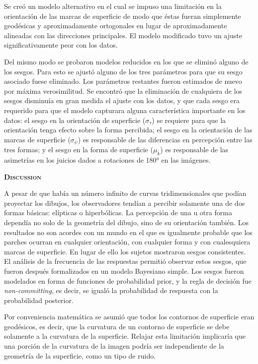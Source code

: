 \documentclass[a4paper,12pt]{article}
\begin{document}
Se creó un modelo alternativo en el cual se impuso una limitación en la orientación de las marcas de superficie de modo que éstas fueran simplemente geodésicas y aproximadamente ortogonales en lugar de aproximadamente alineadas con las direcciones principales. El modelo modificado tuvo un ajuste significativamente peor con los datos.

Del mismo modo se probaron modelos reducidos en los que se eliminó alguno de los sesgos. Para esto se ajustó alguno de los tres parámetros para que su sesgo asociado fuese eliminado. Los parámetros restantes fueron estimados de nuevo por máxima verosimilitud. Se encontró que la eliminación de cualquiera de los sesgos disminuía en gran medida el ajuste con los datos, y que cada sesgo era requerido para que el modelo capturara alguna característica importante en los datos: el sesgo en la orientación de superficie ($\sigma_{\tau}$) se requiere para que la orientación tenga efecto sobre la forma percibida; el sesgo en la orientación de las marcas de superficie ($\sigma_{\psi}$) es responsable de las diferencias en percepción entre las tres formas; y el sesgo en la forma de superficie ($\mu_{k}$) es responsable de las asimetrías en los juicios dados a rotaciones de 180° en las imágenes.

{\scshape\bfseries Discussion}

A pesar de que había un número infinito de curvas tridimensionales que podían proyectar los dibujos, los observadores tendían a percibir solamente una de dos formas básicas: elípticas o hiperbólicas. La percepción de una u otra forma dependía no solo de la geometría del dibujo, sino de su orientación también. Los resultados no son acordes con un mundo en el que es igualmente probable que los parches ocurran en cualquier orientación, con cualquier forma y con cualesquiera marcas de superficie. En lugar de ello los sujetos mostraron sesgos consistentes. El análisis de la frecuencia de las respuestas permitió observar estos sesgos, que fueron después formalizados en un modelo Bayesiano simple. Los sesgos fueron modelados en forma de funciones de probabilidad prior, y la regla de decisión fue {\itshape non-committing}, es decir, se igualó la probabilidad de respuesta con la probabilidad posterior.

Por conveniencia matemática se asumió que todos los contornos de superficie eran geodésicos, es decir, que la curvatura de un contorno de superficie se debe solamente a la curvatura de la superficie. Relajar esta limitación implicaría que una porción de la curvatura de la imagen podría ser independiente de la geometría de la superficie, como un tipo de ruido.
\end{document}
